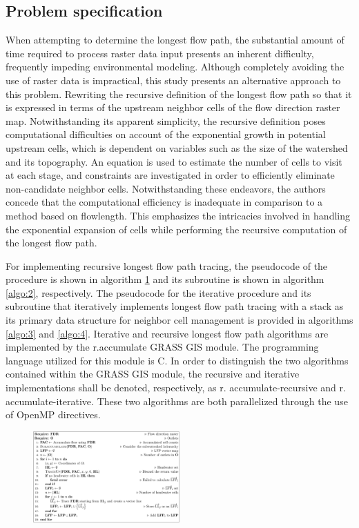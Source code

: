 \documentclass[journal, a4paper]{IEEEtran}
\begin{document}
	\subsection{Problem specification}
	
	When attempting to determine the longest flow path, the substantial amount of time required to process raster data input presents an inherent difficulty, frequently impeding environmental modeling. Although completely avoiding the use of raster data is impractical, this study presents an alternative approach to this problem. Rewriting the recursive definition of the longest flow path so that it is expressed in terms of the upstream neighbor cells of the flow direction raster map. Notwithstanding its apparent simplicity, the recursive definition poses computational difficulties on account of the exponential growth in potential upstream cells, which is dependent on variables such as the size of the watershed and its topography. An equation is used to estimate the number of cells to visit at each stage, and constraints are investigated in order to efficiently eliminate non-candidate neighbor cells. Notwithstanding these endeavors, the authors concede that the computational efficiency is inadequate in comparison to a method based on flowlength. This emphasizes the intricacies involved in handling the exponential expansion of cells while performing the recursive computation of the longest flow path. 
	
	For implementing recursive longest flow path tracing, the pseudocode of the  procedure is shown in algorithm \ref{algo:1} and its subroutine is shown in algorithm \ref{algo:2}, respectively. The pseudocode for the iterative procedure and its subroutine that iteratively implements longest flow path tracing with a stack as its primary data structure for neighbor cell management is provided in algorithms \ref{algo:3} and \ref{algo:4}. Iterative  and recursive longest flow path algorithms are implemented by the r.accumulate GRASS GIS module. The programming language utilized for this module is C. In order to distinguish the two algorithms contained within the GRASS GIS module, the recursive and iterative implementations shall be denoted, respectively, as r. accumulate-recursive and r. accumulate-iterative. These two algorithms are both parallelized through the use of OpenMP directives.
	
	
	
	\begin{figure}[]
		\centering
		\includegraphics[width=0.5\textwidth]{./fig/Algorithm 4.jpg} \hspace*{\fill}
		\label{algo:1}
	\end{figure}
	
\end{document}
